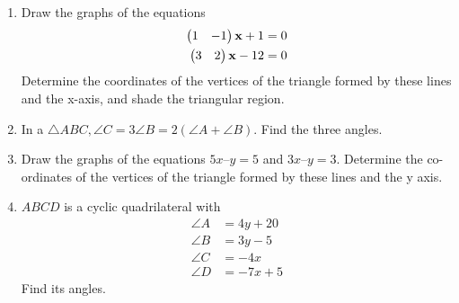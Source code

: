 \documentclass[journal,12pt,twocolumn]{IEEEtran}
\renewcommand\thesection{\arabic{section}}
\begin{document}
\begin{enumerate}[label=\thesection.\arabic*.,ref=\thesection.\theenumi]
%
%
%
%
\item Draw the graphs of the equations 
\begin{align}
\label{eq:1.2.1_p1}
\begin{pmatrix}1 & -1\end{pmatrix}\mathbf{x} + 1 &= 0 
\\
\begin{pmatrix} 3 & 2\end{pmatrix}\mathbf{x} - 12 &= 0
\label{eq:1.2.1_p2}
\end{align}
%
  Determine the coordinates of the vertices of the triangle formed by these lines and the x-axis, and shade the triangular region.
\\
\solution
%
\item In a $\triangle ABC, \angle C = 3 \angle B = 2 (\angle A + \angle B)$. Find the three angles. 
\\
\solution
\item Draw the graphs of the equations $5x – y = 5$ and $3x – y = 3$. Determine the co-ordinates of the vertices of the triangle formed by these lines and the y axis.
\\
\solution

\item $ABCD$ is a cyclic quadrilateral with 
\begin{align}
\angle A &= 4y+20
\\
\angle B &= 3y-5
\\
\angle C &= -4x
\\
\angle D &= -7x+5
\end{align}
%
Find its angles.
\\
\solution
\end{enumerate}
\end{document}
